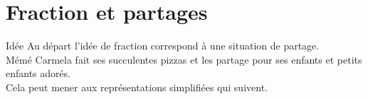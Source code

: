 \section{Fraction et partages}
\begin{myBox}{ Idée}
   Au départ l'idée de fraction correspond à une situation de partage.\\
   Mémé Carmela fait ses succulentes pizzas et les partage pour ses enfants et petits enfants adorés.\\
   Cela peut mener aux représentations simplifiées qui suivent. 
\end{myBox}

